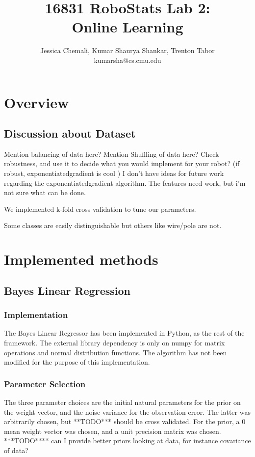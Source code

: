 \documentclass[10pt,a4paper]{article}
\author{Jessica Chemali, Kumar Shaurya Shankar, Trenton Tabor\\kumarsha@cs.cmu.edu}
\title{16831 RoboStats Lab 2: \\Online Learning}
\begin{document}
\maketitle
\section{Overview}
\subsection{Discussion about Dataset}
Mention balancing of data here?
Mention Shuffling of data here?
Check robustness, and use it to decide what you would implement for your robot? (if robust, exponentiatedgradient is cool )
I don't have ideas for future work regarding the exponentiatedgradient algorithm. The features need work, but i'm not sure what can be done.

We implemented k-fold cross validation to tune our parameters.

Some classes are easily distinguishable but others like wire/pole are not.
\section{Implemented methods}
\subsection{Bayes Linear Regression}
\subsubsection{Implementation}
The Bayes Linear Regressor has been implemented in Python, as the rest of the framework. The external library dependency is only on numpy for matrix operations and normal distribution functions. The algorithm has not been modified for the purpose of this implementation.
\subsubsection{Parameter Selection}
The three parameter choices are the initial natural parameters for the prior on the weight vector, and the noise variance for the observation error. The latter was arbitrarily chosen, but **TODO*** should be cross validated. For the prior, a 0 mean weight vector was chosen, and a unit precision matrix was chosen. ***TODO**** can I provide better priors looking at data, for instance covariance of data?
\end{document}
